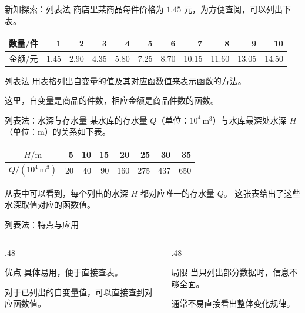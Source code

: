 \begin{frame}[t]{新知探索：列表法}
商店里某商品每件价格为 $1.45$ 元，为方便查阅，可以列出下表。
\vspace{4mm}
\begin{center}\small\setlength{\tabcolsep}{3.2pt}
\begin{tabular}{c*{10}{r}}\toprule
数量/件&1&2&3&4&5&6&7&8&9&10\\\midrule
金额/元&1.45&2.90&4.35&5.80&7.25&8.70&10.15&11.60&13.05&14.50\\\bottomrule
\end{tabular}\end{center}
\vspace{3mm}
\begin{block}{列表法}
用表格列出自变量的值及其对应函数值来表示函数的方法。
\end{block}
这里，自变量是商品的件数，相应金额是商品件数的函数。
\end{frame}
\begin{frame}[t]{列表法：水深与存水量}
某水库的存水量 $Q$（单位：$10^4\,\mathrm m^3$）与水库最深处水深 $H$（单位：$\mathrm m$）的关系如下表。
\vspace{5mm}
\begin{center}\renewcommand{\arraystretch}{1.5}
\begin{tabular}{c*{7}{r}}\toprule
$H/\mathrm m$&5&10&15&20&25&30&35\\\midrule
$Q/(10^4\,\mathrm m^3)$&20&40&90&160&275&437&650\\\bottomrule
\end{tabular}\end{center}
\vspace{3mm}
从表中可以看到，每个列出的水深 $H$ 都对应唯一的存水量 $Q$。
\alert{这张表给出了这些水深取值对应的函数值。}
\end{frame}
\begin{frame}[t]{列表法：特点与应用}
\begin{columns}[T,onlytextwidth]
\begin{column}{.48\textwidth}
\begin{block}{优点}
具体易用，便于直接查表。\par
对于已列出的自变量值，可以直接查到对应函数值。
\end{block}
\end{column}
\begin{column}{.48\textwidth}
\begin{block}{局限}
当只列出部分数据时，信息不够全面。\par
通常不易直接看出整体变化规律。
\end{block}
\end{column}\end{columns}
\vspace{3mm}
\end{frame}
